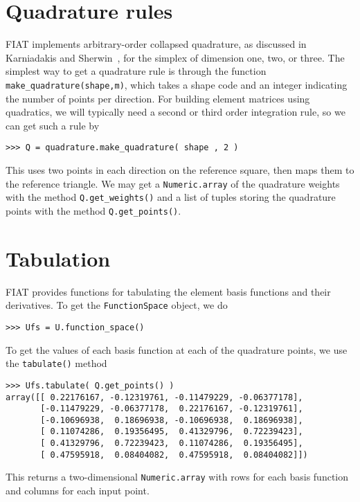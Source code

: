 \documentclass{fenicsmanual}
\begin{document}
\section{Quadrature rules}
FIAT implements arbitrary-order collapsed quadrature, as discussed in
Karniadakis and Sherwin~\cite{}, for the simplex of dimension one,
two, or three.  The simplest way to get a quadrature rule is through
the function \verb.make_quadrature(shape,m)., which takes a shape code
and an integer indicating the number of points per direction.  For
building element matrices using quadratics, we will typically need a
second or third order integration rule, so we can get such a rule by
\begin{verbatim}
>>> Q = quadrature.make_quadrature( shape , 2 )
\end{verbatim}
This uses two points in each direction on the reference square, then
maps them to the reference triangle.  We may get a
\verb/Numeric.array/ of the quadrature weights with the method
\verb/Q.get_weights()/ and a list of tuples storing the quadrature
points with the method \verb/Q.get_points()/.

\section{Tabulation}
FIAT provides functions for tabulating the element basis functions and
their derivatives.  To get the \verb.FunctionSpace. object, we do
\begin{verbatim}
>>> Ufs = U.function_space()
\end{verbatim}
To get the values of each basis function at each of the quadrature
points, we use the \verb.tabulate(). method
\begin{verbatim}
>>> Ufs.tabulate( Q.get_points() )
array([[ 0.22176167, -0.12319761, -0.11479229, -0.06377178],
       [-0.11479229, -0.06377178,  0.22176167, -0.12319761],
       [-0.10696938,  0.18696938, -0.10696938,  0.18696938],
       [ 0.11074286,  0.19356495,  0.41329796,  0.72239423],
       [ 0.41329796,  0.72239423,  0.11074286,  0.19356495],
       [ 0.47595918,  0.08404082,  0.47595918,  0.08404082]])
\end{verbatim}
This returns a two-dimensional \verb/Numeric.array/ with rows for each
basis function and columns for each input point.
\end{document}
